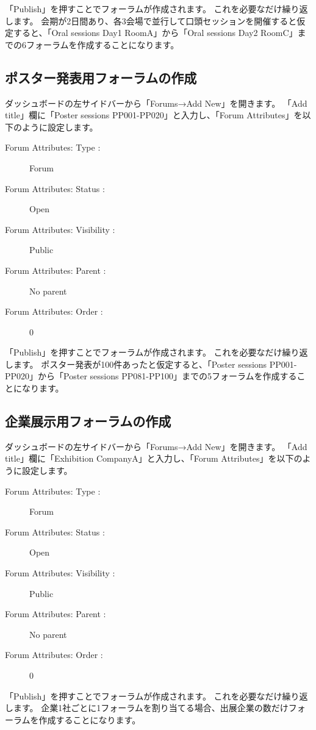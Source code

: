\documentclass[titlepage,10pt,a4paper,uplatex]{jsbook}
\begin{document}
「Publish」を押すことでフォーラムが作成されます。
これを必要なだけ繰り返します。
会期が2日間あり、各3会場で並行して口頭セッションを開催すると仮定すると、「Oral sessions Day1 RoomA」から「Oral sessions Day2 RoomC」までの6フォーラムを作成することになります。

\subsection{ポスター発表用フォーラムの作成}

ダッシュボードの左サイドバーから「Forums→Add New」を開きます。
「Add title」欄に「Poster sessions PP001-PP020」と入力し、「Forum Attributes」を以下のように設定します。

\begin{description}
\item[Forum Attributes: Type : ] Forum
\item[Forum Attributes: Status : ] Open
\item[Forum Attributes: Visibility : ] Public
\item[Forum Attributes: Parent : ] No parent
\item[Forum Attributes: Order : ] 0
\end{description}

「Publish」を押すことでフォーラムが作成されます。
これを必要なだけ繰り返します。
ポスター発表が100件あったと仮定すると、「Poster sessions PP001-PP020」から「Poster sessions PP081-PP100」までの5フォーラムを作成することになります。

\subsection{企業展示用フォーラムの作成}

ダッシュボードの左サイドバーから「Forums→Add New」を開きます。
「Add title」欄に「Exhibition CompanyA」と入力し、「Forum Attributes」を以下のように設定します。

\begin{description}
\item[Forum Attributes: Type : ] Forum
\item[Forum Attributes: Status : ] Open
\item[Forum Attributes: Visibility : ] Public
\item[Forum Attributes: Parent : ] No parent
\item[Forum Attributes: Order : ] 0
\end{description}

「Publish」を押すことでフォーラムが作成されます。
これを必要なだけ繰り返します。
企業1社ごとに1フォーラムを割り当てる場合、出展企業の数だけフォーラムを作成することになります。
\end{document}

